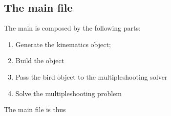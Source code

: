 \documentclass[letterpaper,10pt,english,openany,oneside]{sphinxmanual}
\begin{document}
\subsection{The main file}
\label{\detokenize{tutorial/bird_dynamics:the-main-file}}
The main is composed by the following parts:
\begin{enumerate}
%
\item {} 
Generate the kinematics object;

\item {} 
Build the  object

\item {} 
Pass the bird object to the multiple\sphinxhyphen{}shooting solver

\item {} 
Solve the multiple\sphinxhyphen{}shooting problem

\end{enumerate}

The main file is thus
\end{document}
